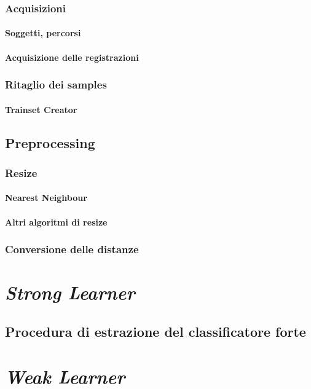             \subsubsection{Acquisizioni}
                \paragraph{Soggetti, percorsi}
                \paragraph{Acquisizione delle registrazioni}
            \subsubsection{Ritaglio dei samples}
                \paragraph{Trainset Creator}
        \subsection{Preprocessing}
        \label{sub:preprocessing}
            \subsubsection{Resize}
                \paragraph{Nearest Neighbour}
                \paragraph{Altri algoritmi di resize}
            \subsubsection{Conversione delle distanze}
    \section{\emph{Strong Learner}}
    \label{sec:strong_learner}
        \subsection{Procedura di estrazione del classificatore forte}
    \section{\emph{Weak Learner}}
    \label{sec:weak_learner}
